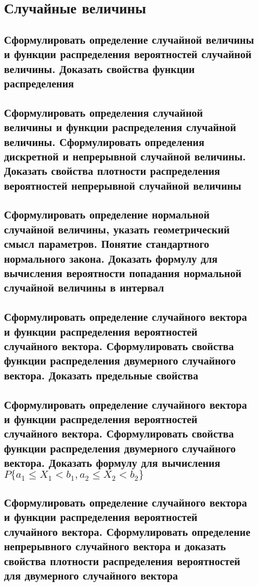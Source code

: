 \documentclass[a4paper]{report}
\theoremstyle{indented}
\begin{document}
\chapter{Случайные величины}

\section{Сформулировать определение случайной величины и функции распределения вероятностей случайной величины.
Доказать свойства функции распределения}

\section{Сформулировать определения случайной величины и функции распределения случайной величины.
Сформулировать определения дискретной и непрерывной случайной величины.
Доказать свойства плотности распределения вероятностей непрерывной случайной величины}

\section{Сформулировать определение нормальной случайной величины, указать геометрический смысл параметров.
Понятие стандартного нормального закона.
Доказать формулу для вычисления вероятности попадания нормальной случайной величины в интервал}

\section{Сформулировать определение случайного вектора и функции распределения вероятностей случайного вектора.
Сформулировать свойства функции распределения двумерного случайного вектора.
Доказать предельные свойства}

\section{Сформулировать определение случайного вектора и функции распределения вероятностей случайного вектора.
Сформулировать свойства функции распределения двумерного случайного вектора.
Доказать формулу для вычисления $P\{a_1 \leqslant X_1 < b_1, a_2 \leqslant X_2 < b_2\}$}

\section{Сформулировать определение случайного вектора и функции распределения вероятностей случайного вектора.
Сформулировать определение непрерывного случайного вектора и доказать свойства плотности распределения вероятностей для двумерного случайного вектора}
\end{document}
